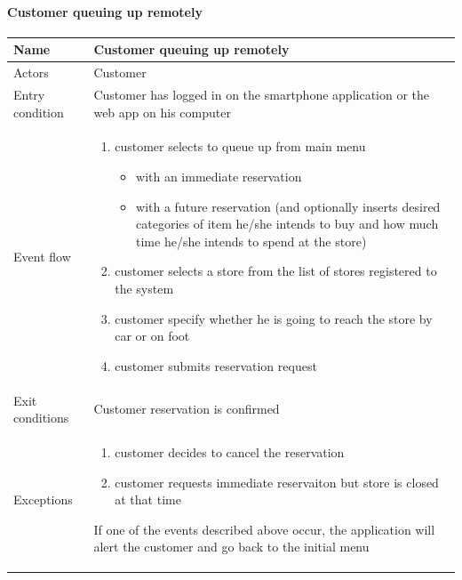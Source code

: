 \paragraph{Customer queuing up remotely}
\begin{flushleft}
	\begin{tabular} { | m{3cm} | m{10cm} | }
		\hline
		Name & Customer queuing up remotely\\
		\hline
		Actors & Customer\\
		\hline
		Entry condition & Customer has logged in on the smartphone application or the web app on his computer\\
		\hline
		Event flow & \begin{enumerate}
			\item customer selects to queue up from main menu
			\begin{itemize}
				\item with an immediate reservation
				\item with a future reservation (and optionally inserts desired categories of item he/she intends to buy and how much time he/she intends to spend at the store)
			\end{itemize}
			\item customer selects a store from the list of stores registered to the system
			\item customer specify  whether he is going to reach the store by car or on foot
			\item customer submits reservation request
		\end{enumerate}\\
		\hline
		Exit conditions & Customer reservation is confirmed\\
		\hline
		Exceptions & \begin{enumerate}
			\item customer decides to cancel the reservation
			\item customer requests immediate reservaiton but store is closed at that time
		\end{enumerate}
		If one of the events described above occur, the application will alert the customer and go back to the initial menu\\
		\hline
	\end{tabular}
\end{flushleft}
\newpage

